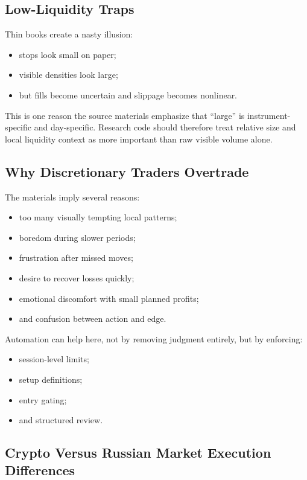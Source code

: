 \subsection{Low-Liquidity Traps}

Thin books create a nasty illusion:
\begin{itemize}
  \item stops look small on paper;
  \item visible densities look large;
  \item but fills become uncertain and slippage becomes nonlinear.
\end{itemize}

This is one reason the source materials emphasize that ``large'' is instrument-specific and day-specific.
Research code should therefore treat relative size and local liquidity context as more important than raw visible volume alone.

\subsection{Why Discretionary Traders Overtrade}

The materials imply several reasons:
\begin{itemize}
  \item too many visually tempting local patterns;
  \item boredom during slower periods;
  \item frustration after missed moves;
  \item desire to recover losses quickly;
  \item emotional discomfort with small planned profits;
  \item and confusion between action and edge.
\end{itemize}

Automation can help here, not by removing judgment entirely, but by enforcing:
\begin{itemize}
  \item session-level limits;
  \item setup definitions;
  \item entry gating;
  \item and structured review.
\end{itemize}

\subsection{Crypto Versus Russian Market Execution Differences}

